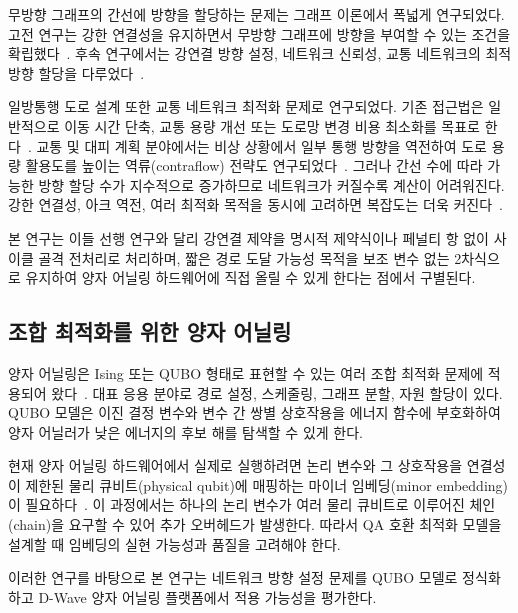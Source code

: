 \documentclass[twocolumn,a4paper]{article}
\begin{document}
무방향 그래프의 간선에 방향을 할당하는 문제는 그래프 이론에서 폭넓게 연구되었다. 고전 연구는 강한 연결성을 유지하면서 무방향 그래프에 방향을 부여할 수 있는 조건을 확립했다~\cite{robbins1939theorem}. 후속 연구에서는 강연결 방향 설정, 네트워크 신뢰성, 교통 네트워크의 최적 방향 할당을 다루었다~\cite{chung1985strongly, roberts1988optimal, roberts1994optimal}.

일방통행 도로 설계 또한 교통 네트워크 최적화 문제로 연구되었다. 기존 접근법은 일반적으로 이동 시간 단축, 교통 용량 개선 또는 도로망 변경 비용 최소화를 목표로 한다~\cite{drezner1997selecting, huang2020bi, huang2020model}. 교통 및 대피 계획 분야에서는 비상 상황에서 일부 통행 방향을 역전하여 도로 용량 활용도를 높이는 역류(contraflow) 전략도 연구되었다~\cite{kim2008contraflow, aksu2014mathematical}. 그러나 간선 수에 따라 가능한 방향 할당 수가 지수적으로 증가하므로 네트워크가 커질수록 계산이 어려워진다. 강한 연결성, 아크 역전, 여러 최적화 목적을 동시에 고려하면 복잡도는 더욱 커진다~\cite{burkard1999minimum, bangjensen2023complexity}.

본 연구는 이들 선행 연구와 달리 강연결 제약을 명시적 제약식이나 페널티 항 없이 사이클 골격 전처리로 처리하며, 짧은 경로 도달 가능성 목적을 보조 변수 없는 2차식으로 유지하여 양자 어닐링 하드웨어에 직접 올릴 수 있게 한다는 점에서 구별된다.

\subsection{조합 최적화를 위한 양자 어닐링} \label{subsec:related_qa}

양자 어닐링은 Ising 또는 QUBO 형태로 표현할 수 있는 여러 조합 최적화 문제에 적용되어 왔다~\cite{qa_for_optimize}. 대표 응용 분야로 경로 설정, 스케줄링, 그래프 분할, 자원 할당이 있다. QUBO 모델은 이진 결정 변수와 변수 간 쌍별 상호작용을 에너지 함수에 부호화하여 양자 어닐러가 낮은 에너지의 후보 해를 탐색할 수 있게 한다.

현재 양자 어닐링 하드웨어에서 실제로 실행하려면 논리 변수와 그 상호작용을 연결성이 제한된 물리 큐비트(physical qubit)에 매핑하는 마이너 임베딩(minor embedding)이 필요하다~\cite{minor_embedding_inQA2, minor_embedding_inQA}. 이 과정에서는 하나의 논리 변수가 여러 물리 큐비트로 이루어진 체인(chain)을 요구할 수 있어 추가 오버헤드가 발생한다. 따라서 QA 호환 최적화 모델을 설계할 때 임베딩의 실현 가능성과 품질을 고려해야 한다.

이러한 연구를 바탕으로 본 연구는 네트워크 방향 설정 문제를 QUBO 모델로 정식화하고 D-Wave 양자 어닐링 플랫폼에서 적용 가능성을 평가한다.
\end{document}
